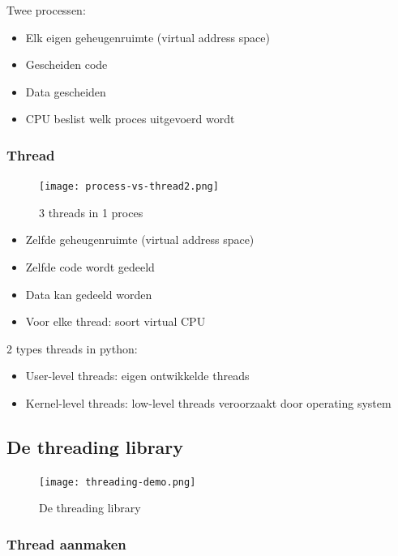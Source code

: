 \documentclass{article}
\begin{document}
Twee processen:

\begin{itemize}
    \item Elk eigen geheugenruimte (virtual address space)
    \item Gescheiden code
    \item Data gescheiden
    \item CPU beslist welk proces uitgevoerd wordt
\end{itemize}

\subsubsection{Thread}

\begin{figure}[H]
    \centering
    \texttt{[image: process-vs-thread2.png]}
    \caption{3 threads in 1 proces}
\end{figure}

\begin{itemize}
    \item Zelfde geheugenruimte (virtual address space)
    \item Zelfde code wordt gedeeld
    \item Data kan gedeeld worden
    \item Voor elke thread: soort virtual CPU
\end{itemize}

2 types threads in python:

\begin{itemize}
    \item User-level threads: eigen ontwikkelde threads
    \item Kernel-level threads: low-level threads veroorzaakt door operating system
\end{itemize}

\subsection{De threading library}

\begin{figure}[H]
    \centering
    \texttt{[image: threading-demo.png]}
    \caption{De threading library}
\end{figure}

\subsubsection{Thread aanmaken}
\end{document}
